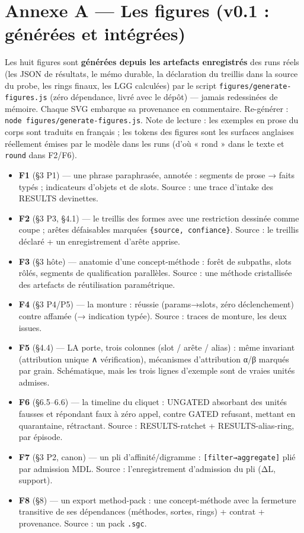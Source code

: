 \documentclass[11pt]{article}
\begin{document}
\section*{Annexe A — Les figures (v0.1 : générées et intégrées)}

Les huit figures sont \textbf{générées depuis les artefacts enregistrés} des runs réels (les JSON de résultats, le mémo durable, la déclaration du treillis dans la source du probe, les rings finaux, les LGG calculées) par le script \texttt{figures/generate-figures.js} (zéro dépendance, livré avec le dépôt) — jamais redessinées de mémoire. Chaque SVG embarque sa provenance en commentaire. Re-générer : \texttt{node figures/generate-figures.js}. Note de lecture : les exemples en prose du corps sont traduits en français ; les tokens des figures sont les surfaces anglaises réellement émises par le modèle dans les runs (d'où « rond » dans le texte et \texttt{round} dans F2/F6).

\begin{itemize}
\item \textbf{F1} (§3 P1) — une phrase paraphrasée, annotée : segments de prose → faits typés ; indicateurs d'objets et de slots. Source : une trace d'intake des RESULTS devinettes.
\item \textbf{F2} (§3 P3, §4.1) — le treillis des formes avec une restriction dessinée comme coupe ; arêtes défaisables marquées \texttt{\{source, confiance\}}. Source : le treillis déclaré + un enregistrement d'arête apprise.
\item \textbf{F3} (§3 hôte) — anatomie d'une concept-méthode : forêt de subpaths, slots rôlés, segments de qualification parallèles. Source : une méthode cristallisée des artefacts de réutilisation paramétrique.
\item \textbf{F4} (§3 P4/P5) — la monture : réussie (params→slots, zéro déclenchement) contre affamée (→ indication typée). Source : traces de monture, les deux issues.
\item \textbf{F5} (§4.4) — LA porte, trois colonnes (slot / arête / alias) : même invariant (attribution unique ∧ vérification), mécanismes d'attribution α/β marqués par grain. Schématique, mais les trois lignes d'exemple sont de vraies unités admises.
\item \textbf{F6} (§6.5–6.6) — la timeline du cliquet : UNGATED absorbant des unités fausses et répondant faux à zéro appel, contre GATED refusant, mettant en quarantaine, rétractant. Source : RESULTS-ratchet + RESULTS-alias-ring, par épisode.
\item \textbf{F7} (§3 P2, canon) — un pli d'affinité/digramme : \texttt{[filter→aggregate]} plié par admission MDL. Source : l'enregistrement d'admission du pli (ΔL, support).
\item \textbf{F8} (§8) — un export method-pack : une concept-méthode avec la fermeture transitive de ses dépendances (méthodes, sortes, rings) + contrat + provenance. Source : un pack \texttt{.sgc}.
\end{itemize}
\end{document}

